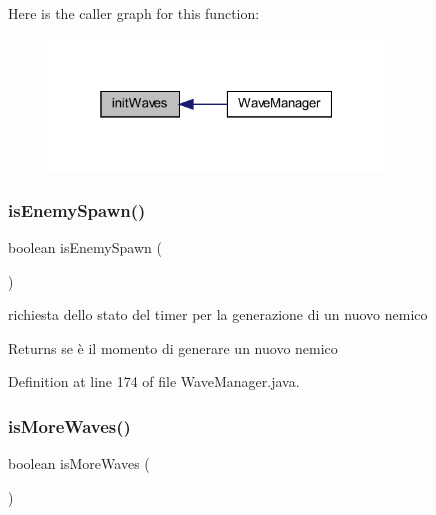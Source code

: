 Here is the caller graph for this function\+:\nopagebreak
\begin{figure}[H]
\begin{center}
\leavevmode
\includegraphics[width=253pt]{classmanagers_1_1_wave_manager_a6df6e01cd643c513c52431c1a86819af_icgraph}
\end{center}
\end{figure}
\mbox{\label{classmanagers_1_1_wave_manager_a121827ebd1c5b24c92f966721b51c0b9}} 
\subsubsection{\texorpdfstring{is\+Enemy\+Spawn()}{isEnemySpawn()}}
{\footnotesize\ttfamily boolean is\+Enemy\+Spawn (\begin{DoxyParamCaption}{ }\end{DoxyParamCaption})}



richiesta dello stato del timer per la generazione di un nuovo nemico 

\begin{DoxyReturn}{Returns}
se è il momento di generare un nuovo nemico 
\end{DoxyReturn}


Definition at line 174 of file Wave\+Manager.\+java.

\mbox{\label{classmanagers_1_1_wave_manager_a999f12a033f49f299ad7f55bcae24447}} 
\subsubsection{\texorpdfstring{is\+More\+Waves()}{isMoreWaves()}}
{\footnotesize\ttfamily boolean is\+More\+Waves (\begin{DoxyParamCaption}{ }\end{DoxyParamCaption})}



